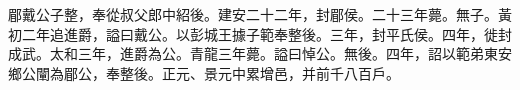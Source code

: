 
\begin{pinyinscope}
郿戴公子整，奉從叔父郎中紹後。建安二十二年，封郿侯。二十三年薨。無子。黃初二年追進爵，謚曰戴公。以彭城王據子範奉整後。三年，封平氏侯。四年，徙封成武。太和三年，進爵為公。青龍三年薨。謚曰悼公。無後。四年，詔以範弟東安鄉公闡為郿公，奉整後。正元、景元中累增邑，并前千八百戶。


\end{pinyinscope}